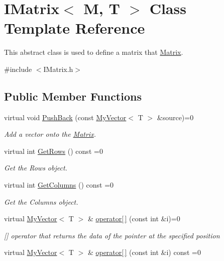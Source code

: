 \hypertarget{class_i_matrix}{}\section{I\+Matrix$<$ M, T $>$ Class Template Reference}
\label{class_i_matrix}


This abstract class is used to define a matrix that \mbox{\hyperlink{class_matrix}{Matrix}}.  




{\ttfamily \#include $<$I\+Matrix.\+h$>$}

\subsection*{Public Member Functions}
\begin{DoxyCompactItemize}
\item 
virtual void \mbox{\hyperlink{class_i_matrix_aa5de147c7aa5b74b0f2177ed1a8158de}{Push\+Back}} (const \mbox{\hyperlink{class_my_vector}{My\+Vector}}$<$ T $>$ \&source)=0
\begin{DoxyCompactList}\small\item\em Add a vector onto the \mbox{\hyperlink{class_matrix}{Matrix}}. \end{DoxyCompactList}\item 
virtual int \mbox{\hyperlink{class_i_matrix_a58632b018f4023768db7963e22f468da}{Get\+Rows}} () const =0
\begin{DoxyCompactList}\small\item\em Get the Rows object. \end{DoxyCompactList}\item 
virtual int \mbox{\hyperlink{class_i_matrix_a3b84da3898ef38bdf281c13f218fc278}{Get\+Columns}} () const =0
\begin{DoxyCompactList}\small\item\em Get the Columns object. \end{DoxyCompactList}\item 
virtual \mbox{\hyperlink{class_my_vector}{My\+Vector}}$<$ T $>$ \& \mbox{\hyperlink{class_i_matrix_a3cfb2490e2849c6c19c1979066a64818}{operator\mbox{[}$\,$\mbox{]}}} (const int \&i)=0
\begin{DoxyCompactList}\small\item\em \mbox{[}\mbox{]} operator that returns the data of the pointer at the specified position \end{DoxyCompactList}\item 
virtual \mbox{\hyperlink{class_my_vector}{My\+Vector}}$<$ T $>$ \& \mbox{\hyperlink{class_i_matrix_a1ed62ee6700728045083c7f0df3e3e62}{operator\mbox{[}$\,$\mbox{]}}} (const int \&i) const =0

\end{DoxyCompactItemize}
